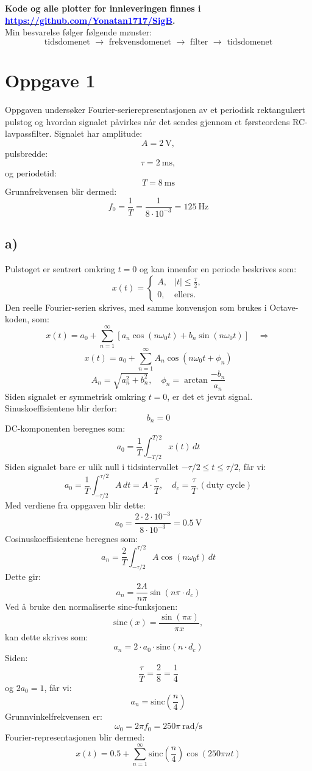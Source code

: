 \noindent \textbf{Kode og alle plotter for innleveringen finnes i \href{https://github.com/Yonatan1717/SigB}{\textcolor{blue}{https://github.com/Yonatan1717/SigB}}.}\\[1em]
Min besvarelse følger følgende mønster: 
\[
   \text{tidsdomenet } \rightarrow \text{ frekvensdomenet } \rightarrow \text{ filter } \rightarrow \text{ tidsdomenet}
\]


\hypertarget{oppgave1}{}
\section*{Oppgave 1}

Oppgaven undersøker Fourier-serierepresentasjonen av et periodisk
rektangulært pulstog og hvordan signalet påvirkes når det sendes
gjennom et førsteordens RC-lavpassfilter. Signalet har amplitude:
\[
A = 2~\mathrm{V},
\]
pulsbredde:
\[
\tau = 2~\mathrm{ms},
\]
og periodetid:
\[
T = 8~\mathrm{ms}
\]
Grunnfrekvensen blir dermed:
\[
f_0 = \frac{1}{T}
    = \frac{1}{8\cdot10^{-3}}
    = 125~\mathrm{Hz}
\]

\hypertarget{a}{}
\subsection*{a)}
Pulstoget er sentrert omkring $t=0$ og kan innenfor en periode
beskrives som:
\[
x(t)=
\begin{cases}
A, & |t| \leq \frac{\tau}{2},\\
0, & \text{ellers}.
\end{cases}
\]
Den reelle Fourier-serien skrives, med samme konvensjon som brukes
i Octave-koden, som:
\[
x(t)
=
a_0
+
\sum_{n=1}^{\infty}
\left[
a_n\cos(n\omega_0t)
+
b_n\sin(n\omega_0t)
\right] \quad \Rightarrow
\]
\[
    x(t) = a_0 + \sum_{n=1}^{\infty} A_n \cos(n\omega_0 t + \phi_n)
\]
\[
    A_n = \sqrt{a_n^2 + b_n^2}, \quad \phi_n = \arctan\frac{-b_n}{a_n}
\]
Siden signalet er symmetrisk omkring $t=0$, er det et jevnt signal.
Sinuskoeffisientene blir derfor:
\[
b_n = 0
\]
DC-komponenten beregnes som:
\[
a_0
=
\frac{1}{T}
\int_{-T/2}^{T/2}x(t)\,dt
\]
Siden signalet bare er ulik null i tidsintervallet $-\tau/2 \leq t \leq \tau/2$, får vi:
\[
a_0
=
\frac{1}{T}
\int_{-\tau/2}^{\tau/2} A\,dt
=
A \cdot \frac{\tau}{T}, \quad d_c = \frac{\tau}{T} \ (\text{duty cycle})
\]
Med verdiene fra oppgaven blir dette:
\[
a_0
=
\frac{2\cdot2\cdot10^{-3}}
     {8\cdot10^{-3}}
=
0.5~\mathrm{V}
\]
Cosinuskoeffisientene beregnes som:
\[
a_{n}
=
\frac{2}{T}
\int_{-\tau/2}^{\tau/2}
A\cos(n\omega_0t)\,dt
\]
Dette gir:
\[
a_n
=
\frac{2A}{n\pi}
\sin\left(
n\pi \cdot d_c
\right)
\]
Ved å bruke den normaliserte sinc-funksjonen:
\[
\mathrm{sinc}(x)
=
\frac{\sin(\pi x)}{\pi x},
\]
kan dette skrives som:
\[
a_n
=
2\cdot a_0 \cdot
\mathrm{sinc}
\left(
n \cdot d_c
\right)
\]
Siden:
\[
\frac{\tau}{T}
=
\frac{2}{8}
=
\frac{1}{4}
\]
og $2a_0=1$, får vi:
\[
a_n
=
\mathrm{sinc}
\left(
\frac{n}{4}
\right)
\]
Grunnvinkelfrekvensen er:
\[
\omega_0
=
2\pi f_0
=
250\pi~\mathrm{rad/s}
\]
Fourier-representasjonen blir dermed:
\[
\boxed{
x(t)
=
0.5
+
\sum_{n=1}^{\infty}
\mathrm{sinc}
\left(
\frac{n}{4}
\right)
\cos(250\pi n t)
}
\]

